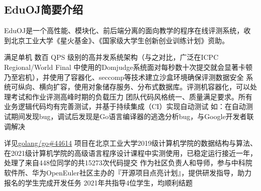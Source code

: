 \documentclass{ctexrep}
\begin{document}
\begin{appendix}
\chapter{EduOJ简要介绍}

EduOJ是一个高性能、模块化、前后端分离的面向教学的程序在线评测系统，收到北京工业大学《星火基金》、《国家级大学生创新创业训练计划》资助。


\begin{outline}
    \1 满足单机 数百 QPS 级别的高并发系统架构（与之对比，广泛在ICPC  Regional/World Final 中使用的Domjudge系统面对每秒数十次提交就会显著卡顿乃至宕机），并使用了容器化、seccomp等技术建立沙盒环境确保评测数据安全
    \1 系统可纵向、横向扩容，使用对象储存服务、分布式数据库。评测机容器化，可以处理考试和作业评测高峰时期的负载压力
    \1 团队代码风格统一、质量满足要求。所有业务逻辑代码均有完善测试，并基于持续集成（CI）实现自动测试
        \2 如：在自动测试期间发现bug，调试后发现是Go语言编译器的逃逸分析bug，与Google开发者联调解决
        
            详见\href{https://github.com/golang/go/issues/44614}{golang/go\#44614}
    \1 项目在北京工业大学2019级计算机学院的数据结构与算法、在2021级计算机学院的高级语言程序设计课程中实测使用，已稳定运行接近一年，处理了来自448位同学的共15273次代码提交
    \1 作为社区负责人和导师，参与中科院软件所、华为OpenEuler社区主办的『开源项目点亮计划』，提供研发指导，助力报名的学生完成开发任务
        \2 2021年共指导4位学生，均顺利结题
\end{outline}



\end{appendix}
\end{document}
